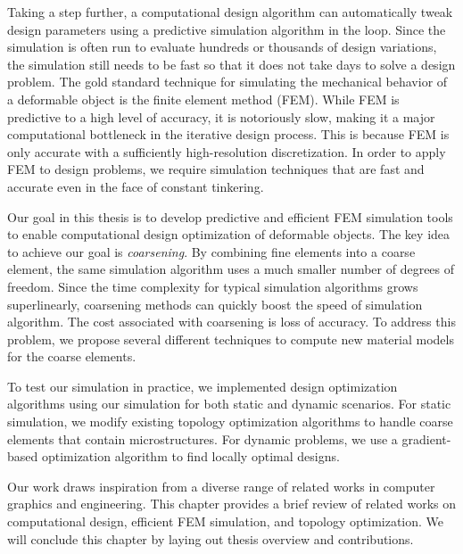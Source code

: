 Taking a step further, a computational design algorithm can automatically tweak design parameters using a predictive simulation algorithm in the loop.
Since the simulation is often run to evaluate hundreds or thousands of design variations, the simulation still needs to be fast so that it does not take days to solve a design problem.
The gold standard technique for simulating the mechanical behavior of a deformable object is the finite element method (FEM).
While FEM is predictive to a high level of accuracy, it is notoriously slow, making it a major computational bottleneck in the iterative design process.
This is because FEM is only accurate with a sufficiently high-resolution discretization.
In order to apply FEM to design problems, we require simulation techniques that are fast and accurate even in the face of constant tinkering.

Our goal in this thesis is to develop predictive and efficient FEM simulation tools to enable computational design optimization of deformable objects.
The key idea to achieve our goal is \textit{coarsening}.
By combining fine elements into a coarse element, the same simulation algorithm uses a much smaller number of degrees of freedom.
Since the time complexity for typical simulation algorithms grows superlinearly,
coarsening methods can quickly boost the speed of simulation algorithm.
The cost associated with coarsening is loss of accuracy.
To address this problem, we propose several different techniques to compute new material models for the coarse elements.

To test our simulation in practice, we implemented design optimization algorithms using our simulation for both static and dynamic scenarios.
For static simulation, we modify existing topology optimization algorithms to handle coarse elements that contain microstructures.
For dynamic problems, we use a gradient-based optimization algorithm to find locally optimal designs.

Our work draws inspiration from a diverse range of related works in computer graphics and engineering.
This chapter provides a brief review of related works on computational design, efficient FEM simulation, and topology optimization.
We will conclude this chapter by laying out thesis overview and contributions.


